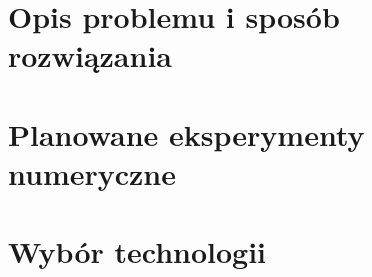 \chapter{Opis problemu i sposób rozwiązania}

\chapter{Planowane eksperymenty numeryczne}

\chapter{Wybór technologii}

